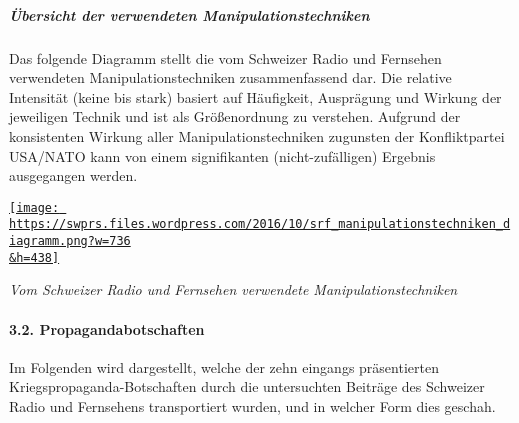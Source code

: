 \hypertarget{uxfcbersicht-der-verwendeten-manipulationstechniken}{%
\subparagraph{\texorpdfstring{\textbf{Übersicht der verwendeten
Manipulationstechniken}}{Übersicht der verwendeten Manipulationstechniken}}\label{uxfcbersicht-der-verwendeten-manipulationstechniken}}

Das folgende Diagramm stellt die vom Schweizer Radio und Fernsehen
verwendeten Manipulationstechniken zusammenfassend dar. Die relative
Intensität (keine bis stark) basiert auf Häufigkeit, Ausprägung und
Wirkung der jeweiligen Technik und ist als Größen­ordnung zu verstehen.
Aufgrund der konsistenten Wirkung aller Manipulationstechniken zugunsten
der Konfliktpartei USA/NATO kann von einem signifikanten
(nicht-zufälligen) Ergebnis ausgegangen werden.

\href{https://swprs.files.wordpress.com/2016/10/srf_manipulationstechniken_diagramm.png}{\texttt{[image: https://swprs.files.wordpress.com/2016/10/srf\_manipulationstechniken\_diagramm.png?w=736\\\&h=438]}}

\emph{Vom Schweizer Radio und Fernsehen verwendete
Manipulationstechniken}

\hypertarget{32-propagandabotschaften}{%
\paragraph{3.2. Propagandabotschaften}\label{32-propagandabotschaften}}

Im Folgenden wird dargestellt, welche der zehn eingangs präsentierten
Kriegspropaganda-Botschaften durch die untersuchten Beiträge des
Schweizer Radio und Fernsehens transportiert wurden, und in welcher Form
dies geschah.


